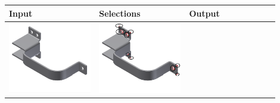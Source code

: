 \begin{minipage}[t]{0.9\linewidth}
\begin{tabular}[h]{@{} p{0.3\linewidth} | p{0.3\linewidth} | p{0.3\linewidth}@{}} \toprule

\textbf{Input} & \textbf{Selections} & \textbf{Output} \\ \midrule

\includegraphics[width=0.98\linewidth]{..//Common/images/DefeatBracketPhase_I_1} &
\includegraphics[width=0.98\linewidth]{..//Common/images/DefeatBracketPhase_I_2_circled} &

\end{tabular}
\end{minipage}
